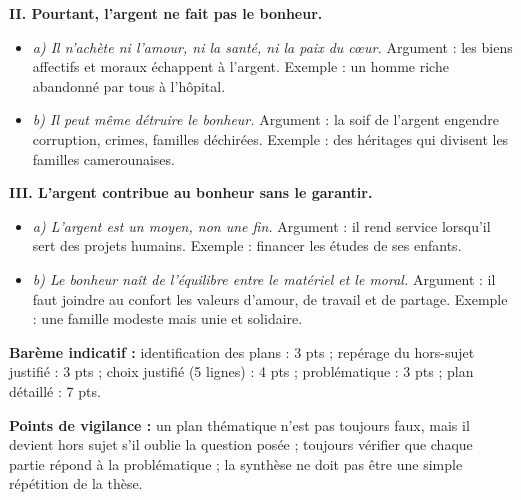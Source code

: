 \documentclass[11pt]{article}
\begin{document}
\begin{corrige}
\begin{enumerate}
\textbf{II. Pourtant, l'argent ne fait pas le bonheur.}
\begin{itemize}
\item \emph{a) Il n'achète ni l'amour, ni la santé, ni la paix du cœur.} Argument : les biens affectifs et moraux échappent à l'argent. Exemple : un homme riche abandonné par tous à l'hôpital.
\item \emph{b) Il peut même détruire le bonheur.} Argument : la soif de l'argent engendre corruption, crimes, familles déchirées. Exemple : des héritages qui divisent les familles camerounaises.
\end{itemize}

\textbf{III. L'argent contribue au bonheur sans le garantir.}
\begin{itemize}
\item \emph{a) L'argent est un moyen, non une fin.} Argument : il rend service lorsqu'il sert des projets humains. Exemple : financer les études de ses enfants.
\item \emph{b) Le bonheur naît de l'équilibre entre le matériel et le moral.} Argument : il faut joindre au confort les valeurs d'amour, de travail et de partage. Exemple : une famille modeste mais unie et solidaire.
\end{itemize}
\end{enumerate}

\textbf{Barème indicatif :} identification des plans : 3 pts ; repérage du hors-sujet justifié : 3 pts ; choix justifié (5 lignes) : 4 pts ; problématique : 3 pts ; plan détaillé : 7 pts.

\textbf{Points de vigilance :} un plan thématique n'est pas toujours faux, mais il devient hors sujet s'il oublie la question posée ; toujours vérifier que chaque partie répond à la problématique ; la synthèse ne doit pas être une simple répétition de la thèse.
\end{corrige}
\end{document}
